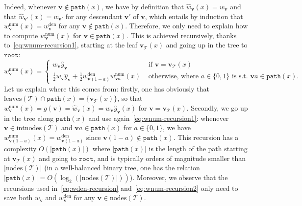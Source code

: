 \documentclass{article}
\newcommand{\pred}{\widehat{y}}
\newcommand{\node}{\mathbf{v}} %
\newcommand{\nodes}{\mathrm{nodes}} %
\newcommand{\inodes}{\mathrm{intnodes}} %
\newcommand{\leaves}{\mathrm{leaves}} %
\renewcommand{\root}{\mathtt{root}} %
\newcommand{\tree}{\mathcal{T}} %
\newcommand{\pathpoint}{\mathtt{path}} %
\newcommand{\wbar}{w^{\mathrm{den}}} %
\newcommand{\wnum}{w^{\mathrm{num}}} %
\newcommand{\wpred}{\widehat{w}}
\begin{document}
Indeed, whenever $\node \notin \pathpoint(x)$, we have by definition that $\wpred_{\node}(x) = w_{\node}$ and that $\wpred_{\node'}(x) = w_{\node'}$ for any descendant $\node'$ of $\node$, which entails by induction that $\wnum_{\node}(x) = \wbar_\node$ for any $\node \notin \pathpoint(x)$.
Therefore, we only need to explain how to compute $\wnum_{\node}(x)$ for $\node \in \pathpoint(x)$.
This is achieved recursively, thanks to~\eqref{eq:wnum-recursion1}, starting at the leaf $\node_\tree(x)$ and going up in the tree to $\root$:
\begin{equation}
    \label{eq:wnum-recursion2}
  \wnum_{\node}(x) =
  \begin{cases}
      w_{\node} \pred_{\node} & \text{ if } \node = \node_\tree (x) \\
      \frac{1}{2} w_{\node} \pred_{\node} + \frac{1}{2} \wbar_{\node (1-a)} \wnum_{\node a}(x) &\text{ otherwise, where } a \in \{ 0, 1 \} \text{ is s.t. } \node a \in \pathpoint(x).
  \end{cases}
\end{equation}
Let us explain where this comes from: firstly, one has obviously that $\leaves(\tree) \cap \pathpoint(x) = \{ \node_\tree(x) \}$, so that $\wnum_{\node}(x) = g(\node) = \wpred_{\node}(x) = w_\node \pred_\node(x)$ for $\node = \node_\tree (x)$.
Secondly, we go up in the tree along $\pathpoint(x)$ and use again~\eqref{eq:wnum-recursion1}: whenever $\node \in \inodes(\tree)$ and $\node a \in \pathpoint(x)$ for $a \in \{0, 1\}$, we have $\wnum_{\node (1 - a)}(x) = \wbar_{\node (1 - a)}$ since $\node (1 - a) \notin \pathpoint(x)$. 
This recursion has a complexity $O(|\pathpoint(x)|)$ where $|\pathpoint(x)|$ is the length of the path starting at $\node_\tree(x)$ and going to $\root$, and is typically orders of magnitude smaller than $|\nodes(\tree)|$ (in a well-balanced binary tree, one has the relation $|\pathpoint(x)| = O(\log_2(|\nodes(\tree)|))$).
Moreover, we observe that the recursions used in~\eqref{eq:wden-recursion} and~\eqref{eq:wnum-recursion2} only need to save both $w_\node$ and $\wbar_\node$ for any $\node \in \nodes(\tree)$.
\end{document}
